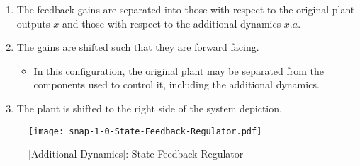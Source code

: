 \documentclass[crop=false,float=true,class=scrreprt]{standalone}
\begin{document}
\begin{enumerate}[leftmargin=*]

\item The feedback gains are separated into 
      those with respect to the original plant outputs $x$ and
      those with respect to the additional dynamics $x.a$.

\item The gains are shifted such that they are forward facing.
      \begin{itemize}
      
      \item In this configuration, 
            the original plant may be separated from the components used to control it, 
            including the additional dynamics.
      
      \end{itemize}

\item The plant is shifted to the right side of the system depiction.


\end{enumerate}




\clearpage




\begin{landscape}
\begin{figure}[H]%
\centering%
\begin{minipage}[c][0.995\textheight][c]{0.995\linewidth}%
\centering%
\texttt{[image: snap-1-0-State-Feedback-Regulator.pdf]}%
\caption[{[Additional Dynamics]: State Feedback Regulator}]%
        {{[Additional Dynamics]: State Feedback Regulator%
          \label{FIG:controllerDesign:additionalDynamics:background:1p0:stateFeedbackRegulator}%
        }}%
\end{minipage}%
\end{figure}
\end{landscape}
\end{document}
